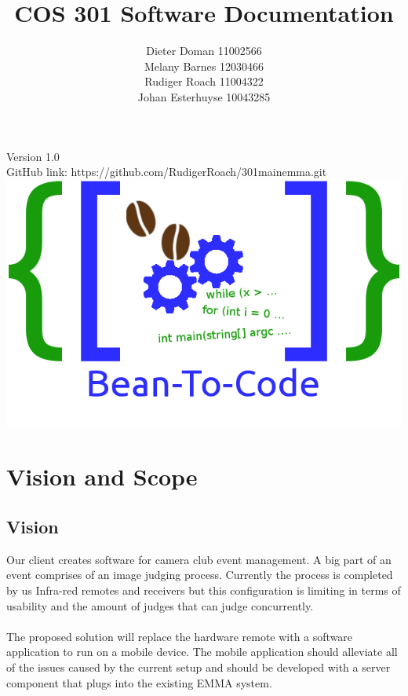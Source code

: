 \documentclass[10pt,a4paper]{article}
\title{COS 301 Software Documentation}
\author{Dieter Doman 11002566 \\
		Melany Barnes 12030466 \\
		Rudiger Roach 11004322 \\
		Johan Esterhuyse 10043285}
\date{}
\begin{document}
\maketitle
\begin{center}
Version 1.0 \\
GitHub link: https://github.com/RudigerRoach/301\textunderscore main\textunderscore emma.git \\
\vspace*{5\baselineskip}
\includegraphics[scale=0.35]{Pictures/Logo.png}
\end{center}
\pagebreak
\tableofcontents
\pagebreak
\section{Vision and Scope}

\subsection{Vision}
Our client creates software for camera club event management. A big part of an event comprises of an image judging process. Currently the process is completed by us Infra-red remotes and receivers but this configuration is limiting in terms of usability and the amount of judges that can judge concurrently.\\\\
The proposed solution will replace the hardware remote with a software application to run on a mobile device. The mobile application should alleviate all of the issues caused by the current setup and should be developed with a server component that plugs into the existing EMMA system.  
\end{document}
